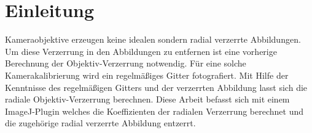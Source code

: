 \section{Einleitung}\label{sec:Introduction}


Kameraobjektive erzeugen keine idealen sondern radial verzerrte Abbildungen. Um diese Verzerrung in den Abbildungen zu entfernen ist eine vorherige Berechnung der Objektiv-Verzerrung notwendig. 
Für eine solche Kamerakalibrierung wird ein regelmäßiges Gitter fotografiert. 
Mit Hilfe der Kenntnisse des regelmäßigen Gitters und der verzerrten Abbildung lasst sich die radiale Objektiv-Verzerrung berechnen. 
Diese Arbeit befasst sich mit einem ImageJ-Plugin welches die Koeffizienten der radialen Verzerrung berechnet und die zugehörige radial verzerrte Abbildung entzerrt.






















